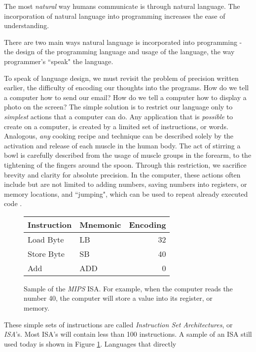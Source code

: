\documentclass[12pt]{article}
\begin{document}
\begin{flushleft}
\begin{enumerate}
The most \textit{natural} way humans communicate is through natural
language. The incorporation of natural language into programming
increases the ease of understanding.
\end{enumerate}
There are two main ways natural language is incorporated into programming
- the design of the programming language and usage of the language, the
way programmer's ``speak" the language.

To speak of language design, we must revisit the problem of precision
written earlier, the difficulty of encoding our thoughts into the programs.
How do we tell a computer how to send our email?
How do we tell a computer how to display a photo on the screen?
The simple solution is to restrict our language only to \textit{simplest}
actions that a computer can do. Any application that is \textit{possible} to
create on a computer, is created by a limited set of instructions, or words.
Analogous, \textit{any} cooking recipe and technique can be described solely
by the activation and release of each muscle in the human body. The act
of stirring a bowl is carefully described from the usage of muscle groups
in the forearm, to the tightening of the fingers around the spoon.
Through this restriction, we sacrifice brevity and clarity for absolute
precision.
In the computer, these actions often include but are not limited to
adding numbers, saving numbers into registers, or memory locations,
and ``jumping", which can be used to repeat already executed code \footnotemark.

\begin{figure}[h]
\centering
\caption[Caption for LOF]{
Sample of the \textit{MIPS} ISA.
For example, when the computer reads the number 40, the computer will store
a value into its register, or memory. \footnotemark
}
\begin{tabular}{l l r}
Instruction & Mnemonic & Encoding \\
\hline
Load Byte & LB & 32 \\
Store Byte & SB & 40 \\
Add & ADD & 0 \\
\end{tabular}

\label{fig:MIPS_sample}
\end{figure}

These simple sets of instructions are called
\textit{Instruction Set Architectures}, or \textit{ISA}'s. Most ISA's will
contain less than 100 instructions. A sample of an ISA still used today is shown
in Figure \ref{fig:MIPS_sample}. Languages that directly 


\end{flushleft}
\end{document}
